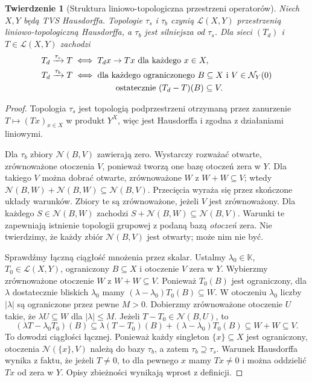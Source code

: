 \documentclass[11pt,a4paper]{article}
\numberwithin{equation}{section}
\theoremstyle{plain}
\newtheorem{twierdzenie}{Twierdzenie}[section]
\theoremstyle{definition}
\theoremstyle{remark}
\newcommand{\K}{\mathbb K}
\begin{document}
\begin{twierdzenie}[Struktura liniowo-topologiczna przestrzeni operatorów]
\label{thm:op-topologies}
Niech $X,Y$ będą TVS Hausdorffa. Topologie $\tau_s$ i
$\tau_b$ czynią $\mathcal L(X,Y)$ przestrzenią
liniowo-topologiczną Hausdorffa, a $\tau_b$ jest silniejsza
od $\tau_s$. Dla sieci $(T_d)$ i $T\in\mathcal L(X,Y)$
zachodzi
\begin{align*}
 T_d\xrightarrow{\tau_s}T
 &\iff T_dx\to Tx\ \text{dla każdego }x\in X,\\
 T_d\xrightarrow{\tau_b}T
 &\iff \text{dla każdego ograniczonego }B\subseteq X
 \text{ i }V\in\mathcal N_Y(0)\\
 &\hspace{18mm}\text{ostatecznie }(T_d-T)(B)\subseteq V.
\end{align*}
\end{twierdzenie}
\begin{proof}
Topologia $\tau_s$ jest topologią podprzestrzeni
otrzymaną przez zanurzenie $T\mapsto(Tx)_{x\in X}$
w produkt $Y^X$, więc jest Hausdorffa i zgodna z
działaniami liniowymi.

Dla $\tau_b$ zbiory $\mathcal N(B,V)$ zawierają zero.
Wystarczy rozważać otwarte, zrównoważone otoczenia $V$,
ponieważ tworzą one bazę otoczeń zera w $Y$.
Dla takiego $V$ można dobrać otwarte, zrównoważone
$W$ z $W+W\subseteq V$;
wtedy
$\mathcal N(B,W)+\mathcal N(B,W)\subseteq\mathcal N(B,V)$.
Przecięcia wyraża się przez skończone układy warunków.
Zbiory te są zrównoważone, jeżeli $V$ jest zrównoważony.
Dla każdego $S\in\mathcal N(B,W)$ zachodzi
$S+\mathcal N(B,W)\subseteq\mathcal N(B,V)$.
Warunki te zapewniają istnienie topologii grupowej
z podaną bazą \emph{otoczeń} zera. Nie twierdzimy, że każdy
zbiór $\mathcal N(B,V)$ jest otwarty; może nim nie być.

Sprawdźmy łączną ciągłość mnożenia przez skalar.
Ustalmy $\lambda_0\in\K$, $T_0\in\mathcal L(X,Y)$,
ograniczony $B\subseteq X$ i otoczenie $V$ zera w $Y$.
Wybierzmy zrównoważone otoczenie $W$ z $W+W\subseteq V$.
Ponieważ $T_0(B)$ jest ograniczony, dla $\lambda$
dostatecznie bliskich $\lambda_0$ mamy
$(\lambda-\lambda_0)T_0(B)\subseteq W$.
W otoczeniu $\lambda_0$ liczby $|\lambda|$ są ograniczone
przez pewne $M>0$. Dobierzmy zrównoważone otoczenie
$U$ takie, że $\lambda U\subseteq W$ dla $|\lambda|\le M$.
Jeżeli $T-T_0\in\mathcal N(B,U)$, to
\[
 (\lambda T-\lambda_0T_0)(B)
 \subseteq\lambda(T-T_0)(B)+(\lambda-\lambda_0)T_0(B)
 \subseteq W+W\subseteq V.
\]
To dowodzi ciągłości łącznej. Ponieważ każdy singleton
$\{x\}\subseteq X$ jest ograniczony, otoczenia
$\mathcal N(\{x\},V)$ należą do bazy $\tau_b$,
a zatem $\tau_b\supseteq\tau_s$. Warunek Hausdorffa
wynika z faktu, że jeżeli $T\ne0$, to dla pewnego $x$
mamy $Tx\ne0$ i można oddzielić $Tx$ od zera w $Y$.
Opisy zbieżności wynikają wprost z definicji.
\end{proof}
\end{document}
